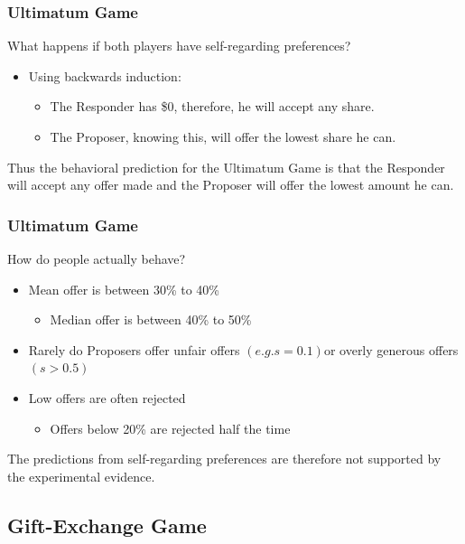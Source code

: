\documentclass{beamer}
\begin{document}
\begin{frame}
	\frametitle{Ultimatum Game}
	What happens if both players have self-regarding preferences?

\begin{itemize}
\item Using backwards induction:
\begin{itemize}

\item The Responder has \$0, therefore, he will accept any share.

\item The Proposer, knowing this, will offer the lowest share he can.
\end{itemize}
\end{itemize}

Thus the behavioral prediction for the Ultimatum Game is that the Responder will accept any offer made and the Proposer will offer the lowest amount he can.

\end{frame}

\begin{frame}
	\frametitle{Ultimatum Game}
	How do people actually behave?
	\begin{itemize}
		\item Mean offer is between 30\% to 40\%
		\begin{itemize}
			\item Median offer is between 40\% to 50\%
		\end{itemize}
		\item  Rarely do Proposers offer unfair offers $\left(e.g. s=0.1\right)$or overly generous offers $\left(s>0.5\right)$
		\item  Low offers are often rejected
		\begin{itemize}
			\item Offers below 20\% are rejected half the time
		\end{itemize}
	\end{itemize}

The predictions from self-regarding preferences are therefore not supported by the experimental evidence.

\end{frame}

\subsection{Gift-Exchange Game}
\end{document}
